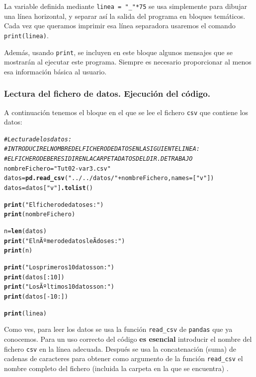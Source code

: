 \documentclass[10pt,a4paper]{article}\usepackage[]{graphicx}\usepackage[]{color}
\makeatletter
\newcommand{\hlstr}[1]{\textcolor[rgb]{0.192,0.494,0.8}{#1}}%
\newcommand{\hlcom}[1]{\textcolor[rgb]{0.678,0.584,0.686}{\textit{#1}}}%
\newcommand{\hlkwd}[1]{\textcolor[rgb]{0.737,0.353,0.396}{\textbf{#1}}}%
\newenvironment{kframe}{%
 \def\at@end@of@kframe{}%
 \ifinner\ifhmode%
  \def\at@end@of@kframe{\end{minipage}}%
  \begin{minipage}{\columnwidth}%
 \fi\fi%
 \def\FrameCommand##1{\hskip\@totalleftmargin \hskip-\fboxsep
 \colorbox{shadecolor}{##1}\hskip-\fboxsep
     \hskip-\linewidth \hskip-\@totalleftmargin \hskip\columnwidth}%
 \MakeFramed {\advance\hsize-\width
   \@totalleftmargin\z@ \linewidth\hsize
   \@setminipage}}%
 {\par\unskip\endMakeFramed%
 \at@end@of@kframe}
\newenvironment{knitrout}{}{} %
\newcounter {cont01}
\makeatother
\begin{document}
La variable definida mediante \verb&linea = "_"*75& se usa simplemente para dibujar una línea horizontal, y separar así la salida del programa en bloques temáticos. Cada vez que queramos imprimir esa línea separadora usaremos el comando {\tt print(linea)}.

Además, usando {\tt print}, se incluyen en este bloque algunos mensajes que se mostrarán al ejecutar este programa. Siempre es necesario proporcionar al menos esa información básica al usuario.

\subsubsection*{Lectura del fichero de datos. Ejecución del código.}
\label{tut02:subsubsec:lecturaDatos}

A continuación tenemos el bloque en el que se lee el fichero {\tt csv} que contiene los datos:
\begin{knitrout}
\color{fgcolor}\begin{kframe}
\begin{alltt}
\hlcom{# Lectura de los datos:}
\hlcom{# INTRODUCIR EL NOMBRE DEL FICHERO DE DATOS EN LA SIGUIENTE LINEA:}
\hlcom{# EL FICHERO DEBE RESIDIR EN LA CARPETA DATOS DEL DIR. DE TRABAJO}
nombreFichero = \hlstr{"Tut02-var3.csv"}
datos = \hlkwd{pd.read_csv}(\hlstr{"../../datos/"} + nombreFichero, names=[\hlstr{"v"}])
datos = datos[\hlstr{"v"}]\hlkwd{.tolist}()

\hlkwd{print}(\hlstr{"El fichero de datos es:"})
\hlkwd{print}(nombreFichero)

n = \hlkwd{len}(datos)
\hlkwd{print}(\hlstr{"El nÃºmero de datos leÃ­dos es:"})
\hlkwd{print}(n)

\hlkwd{print}(\hlstr{"Los primeros 10 datos son:"})
\hlkwd{print}(datos[:10])
\hlkwd{print}(\hlstr{"Los Ãºltimos 10 datos son:"})
\hlkwd{print}(datos[-10:])

\hlkwd{print}(linea)
\end{alltt}
\end{kframe}
\end{knitrout}
Como ves, para leer los datos se usa la función \verb&read_csv& de {\tt pandas} que ya conocemos. Para un uso correcto del código {\bf es esencial} introducir el nombre del fichero {\tt csv} en la línea adecuada. Después se usa la concatenación (suma) de cadenas de caracteres para obtener como argumento de la función \verb&read_csv& el nombre completo del fichero (incluida la carpeta en la que se encuentra) .
\end{document}
